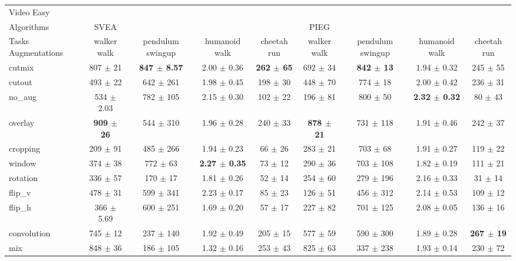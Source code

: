 \begin{tabular}{lcccccccc}
Video Easy & & & & & & & & \\
Algorithms & SVEA & & & & PIEG & & & \\
Tasks Augmentations & walker walk & pendulum swingup & humanoid walk & cheetah run & walker walk & pendulum swingup & humanoid walk & cheetah run \\
cutmix          & 807 $\pm$ 21 & \textbf{847 $\pm$ 8.57} & 2.00 $\pm$ 0.36 & \textbf{262 $\pm$ 65} & 692 $\pm$ 34 & \textbf{842 $\pm$ 13} & 1.94 $\pm$ 0.32 & 245 $\pm$ 55 \\
cutout          & 493 $\pm$ 22 & 642 $\pm$ 261 & 1.98 $\pm$ 0.45 & 198 $\pm$ 30 & 448 $\pm$ 70 & 774 $\pm$ 18 & 2.00 $\pm$ 0.42 & 236 $\pm$ 31 \\
no\_aug         & 534 $\pm$ 2.03 & 782 $\pm$ 105 & 2.15 $\pm$ 0.30 & 102 $\pm$ 22 & 196 $\pm$ 81 & 800 $\pm$ 50 & \textbf{2.32 $\pm$ 0.32} & 80 $\pm$ 43 \\
overlay         & \textbf{909 $\pm$ 26} & 544 $\pm$ 310 & 1.96 $\pm$ 0.28 & 240 $\pm$ 33 & \textbf{878 $\pm$ 21} & 731 $\pm$ 118 & 1.91 $\pm$ 0.46 & 242 $\pm$ 37 \\
cropping        & 209 $\pm$ 91 & 485 $\pm$ 266 & 1.94 $\pm$ 0.23 & 66 $\pm$ 26 & 283 $\pm$ 21 & 703 $\pm$ 68 & 1.91 $\pm$ 0.27 & 119 $\pm$ 22 \\
window          & 374 $\pm$ 38 & 772 $\pm$ 63 & \textbf{2.27 $\pm$ 0.35} & 73 $\pm$ 12 & 290 $\pm$ 36 & 703 $\pm$ 108 & 1.82 $\pm$ 0.19 & 111 $\pm$ 21 \\
rotation        & 336 $\pm$ 57 & 170 $\pm$ 17 & 1.81 $\pm$ 0.26 & 52 $\pm$ 14 & 254 $\pm$ 60 & 279 $\pm$ 196 & 2.16 $\pm$ 0.33 & 31 $\pm$ 14 \\
flip\_v         & 478 $\pm$ 31 & 599 $\pm$ 341 & 2.23 $\pm$ 0.17 & 85 $\pm$ 23 & 126 $\pm$ 51 & 456 $\pm$ 312 & 2.14 $\pm$ 0.53 & 109 $\pm$ 12 \\
flip\_h         & 366 $\pm$ 5.69 & 600 $\pm$ 251 & 1.69 $\pm$ 0.20 & 57 $\pm$ 17 & 227 $\pm$ 82 & 701 $\pm$ 125 & 2.08 $\pm$ 0.05 & 136 $\pm$ 16 \\
convolution     & 745 $\pm$ 12 & 237 $\pm$ 140 & 1.92 $\pm$ 0.49 & 205 $\pm$ 15 & 577 $\pm$ 59 & 590 $\pm$ 300 & 1.89 $\pm$ 0.28 & \textbf{267 $\pm$ 19} \\
mix             & 848 $\pm$ 36 & 186 $\pm$ 105 & 1.32 $\pm$ 0.16 & 253 $\pm$ 43 & 825 $\pm$ 63 & 337 $\pm$ 238 & 1.93 $\pm$ 0.14 & 230 $\pm$ 72 \\
\end{tabular}
